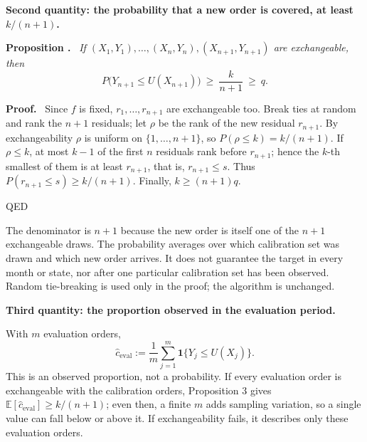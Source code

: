 \documentclass[11pt]{article}
\newcommand{\1}{\mathbf 1}
\newcounter{prop}
\newenvironment{prop}{\refstepcounter{prop}\par\medskip\noindent\textbf{Proposition \theprop.}\ \itshape}{\par\medskip}
\newenvironment{pf}{\par\noindent\textbf{Proof.}\ }{\par\noindent\hfill QED\par\medskip}
\begin{document}
\textbf{Second quantity: the probability that a new order is covered, at least \(k/(n+1)\).}

\begin{prop}
If \((X_1,Y_1),\dots,(X_n,Y_n),(X_{n+1},Y_{n+1})\) are exchangeable, then
\[
P\bigl(Y_{n+1}\le U(X_{n+1})\bigr)\ \ge\ \frac{k}{n+1}\ \ge\ q .
\]
\end{prop}

\begin{pf}
Since \(f\) is fixed, \(r_1,\dots,r_{n+1}\) are exchangeable too. Break ties at random and rank the \(n+1\) residuals; let \(\rho\) be the rank of the new residual \(r_{n+1}\). By exchangeability \(\rho\) is uniform on \(\{1,\dots,n+1\}\), so \(P(\rho\le k)=k/(n+1)\). If \(\rho\le k\), at most \(k-1\) of the first \(n\) residuals rank before \(r_{n+1}\); hence the \(k\)-th smallest of them is at least \(r_{n+1}\), that is, \(r_{n+1}\le s\). Thus \(P(r_{n+1}\le s)\ge k/(n+1)\). Finally, \(k\ge(n+1)q\).
\end{pf}

The denominator is \(n+1\) because the new order is itself one of the \(n+1\) exchangeable draws. The probability averages over which calibration set was drawn and which new order arrives. It does not guarantee the target in every month or state, nor after one particular calibration set has been observed. Random tie-breaking is used only in the proof; the algorithm is unchanged.

\textbf{Third quantity: the proportion observed in the evaluation period.}

With \(m\) evaluation orders,
\[
\hat c_{\mathrm{eval}}:=\frac1m\sum_{j=1}^m \1\{Y_j\le U(X_j)\}.
\]
This is an observed proportion, not a probability. If every evaluation order is exchangeable with the calibration orders, Proposition 3 gives \(\mathbb E[\hat c_{\mathrm{eval}}]\ge k/(n+1)\); even then, a finite \(m\) adds sampling variation, so a single value can fall below or above it. If exchangeability fails, it describes only these evaluation orders.
\end{document}
